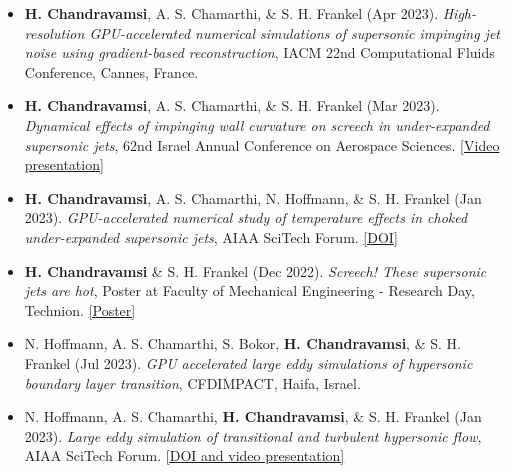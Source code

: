 \begin{itemize}[itemsep=0pt, topsep=0pt, label=]
    \item \textbf{H. Chandravamsi}, A. S. Chamarthi, \& S. H. Frankel (Apr 2023). \textit{High-resolution GPU-accelerated numerical simulations of supersonic impinging jet noise using gradient-based reconstruction}, IACM 22nd Computational Fluids Conference, Cannes, France.
\end{itemize}

\begin{itemize}[itemsep=0pt, topsep=0pt, label=]
    \item \textbf{H. Chandravamsi}, A. S. Chamarthi, \& S. H. Frankel (Mar 2023). \textit{Dynamical effects of impinging wall curvature on screech in under-expanded supersonic jets}, 62nd Israel Annual Conference on Aerospace Sciences. \href{https://youtu.be/AaOXwH73AFE}{[Video presentation]}
\end{itemize}

\begin{itemize}[itemsep=0pt, topsep=0pt, label=]
    \item \textbf{H. Chandravamsi}, A. S. Chamarthi, N. Hoffmann, \& S. H. Frankel (Jan 2023). \textit{GPU-accelerated numerical study of temperature effects in choked under-expanded supersonic jets}, AIAA SciTech Forum. \href{https://doi.org/10.2514/6.2023-0976}{[DOI]}
\end{itemize}

\begin{itemize}[itemsep=0pt, topsep=0pt, label=]
    \item \textbf{H. Chandravamsi} \& S. H. Frankel (Dec 2022). \textit{Screech! These supersonic jets are hot}, Poster at Faculty of Mechanical Engineering - Research Day, Technion. \href{https://hemanthgrylls.github.io/gallery.html}{[Poster]}
\end{itemize}

\begin{itemize}[itemsep=0pt, topsep=0pt, label=]
    \item N. Hoffmann, A. S. Chamarthi, S. Bokor, \textbf{H. Chandravamsi}, \& S. H. Frankel (Jul 2023). \textit{GPU accelerated large eddy simulations of hypersonic boundary layer transition}, CFDIMPACT, Haifa, Israel.
\end{itemize}

\begin{itemize}[itemsep=0pt, topsep=0pt, label=]
    \item N. Hoffmann, A. S. Chamarthi, \textbf{H. Chandravamsi}, \& S. H. Frankel (Jan 2023). \textit{Large eddy simulation of transitional and turbulent hypersonic flow}, AIAA SciTech Forum. \href{https://doi.org/10.2514/6.2023-1383}{[DOI and video presentation]}
\end{itemize}

